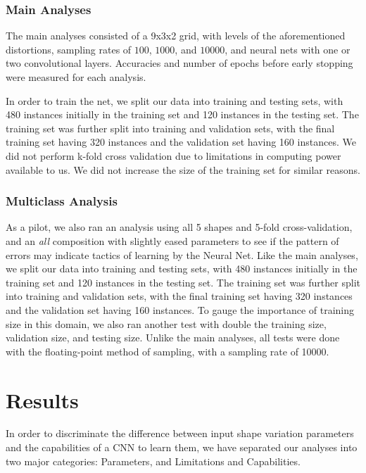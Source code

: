 \documentclass{article}
\begin{document}
\subsubsection{Main Analyses}
The main analyses consisted of a 9x3x2 grid, with levels of the aforementioned distortions, sampling rates of $100$, $1000$, and $10000$, and neural nets with
one or two convolutional layers. Accuracies and number of epochs before early stopping were measured for each analysis.

In order to train the net, we split our data into training and testing sets,
with 480 instances initially in the training set and 120 instances in the testing set.
The training set was further split into training and validation sets, with the
final training set having 320 instances and the validation set having 160 instances.
We did not perform k-fold cross validation due to limitations in computing power
available to us. We did not increase the size of the training set for similar reasons.

\subsubsection{Multiclass Analysis}
As a pilot, we also ran an analysis using all 5 shapes and 5-fold cross-validation, and an \textit{all} composition with slightly eased parameters to see if the pattern of errors may
indicate tactics of learning by the Neural Net. Like the main analyses, we split our data into training and testing sets,
with 480 instances initially in the training set and 120 instances in the testing set.
The training set was further split into training and validation sets, with the
final training set having 320 instances and the validation set having 160 instances.
To gauge the importance of training size in this domain, we also ran another test with double the training size,
validation size, and testing size.
Unlike the main analyses, all tests were done with the floating-point method of sampling, with a sampling rate of 10000.


\section{Results}
In order to discriminate the difference between input shape variation parameters and
the capabilities of a CNN to learn them, we have separated our analyses into two major
categories: Parameters, and Limitations and Capabilities.
\end{document}
